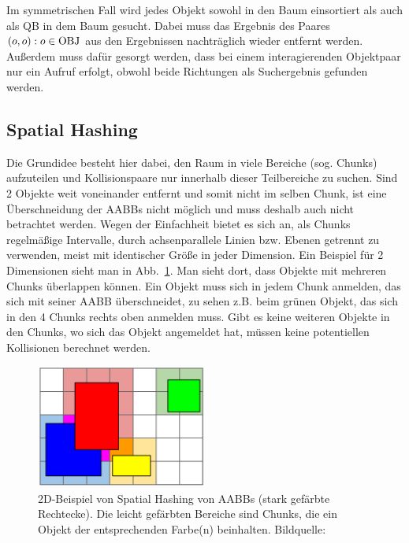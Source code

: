  
Im symmetrischen Fall wird jedes Objekt sowohl in den Baum einsortiert als auch als QB in dem Baum gesucht. Dabei muss das Ergebnis des Paares $(o, o) : o \in \operatorname{OBJ}$ aus den Ergebnissen nachträglich wieder entfernt werden. Außerdem muss dafür gesorgt werden, dass bei einem interagierenden Objektpaar nur ein Aufruf erfolgt, obwohl beide Richtungen als Suchergebnis gefunden werden.\\

\subsection{Spatial Hashing}
\label{sec:spatialHashing}
Die Grundidee besteht hier dabei, den Raum in viele Bereiche (sog. Chunks) aufzuteilen und Kollisionspaare nur innerhalb dieser Teilbereiche zu suchen. Sind 2 Objekte weit voneinander entfernt und somit nicht im selben Chunk, ist eine Überschneidung der AABBs nicht möglich und muss deshalb auch nicht betrachtet werden. Wegen der Einfachheit bietet es sich an, als Chunks regelmäßige Intervalle, durch achsenparallele Linien bzw. Ebenen getrennt zu verwenden, meist mit identischer Größe in jeder Dimension. Ein Beispiel für 2 Dimensionen sieht man in Abb.~\ref{fig:spatialHashing}.
Man sieht dort, dass Objekte mit mehreren Chunks überlappen können. Ein Objekt muss sich in jedem Chunk anmelden, das sich mit seiner AABB überschneidet, zu sehen z.B. beim grünen Objekt, das sich in den 4 Chunks rechts oben anmelden muss. Gibt es keine weiteren Objekte in den Chunks, wo sich das Objekt angemeldet hat, müssen keine potentiellen Kollisionen berechnet werden.\\
\begin{figure}
    \centering
    \includegraphics[width=0.5\textwidth]{./res/spatialHashingAABB.png}
    \caption{2D-Beispiel von Spatial Hashing von AABBs (stark gefärbte Rechtecke). Die leicht gefärbten Bereiche sind Chunks, die ein Objekt der entsprechenden Farbe(n) beinhalten. Bildquelle: \cite{spatialHashing}}
    \label{fig:spatialHashing}
\end{figure}
